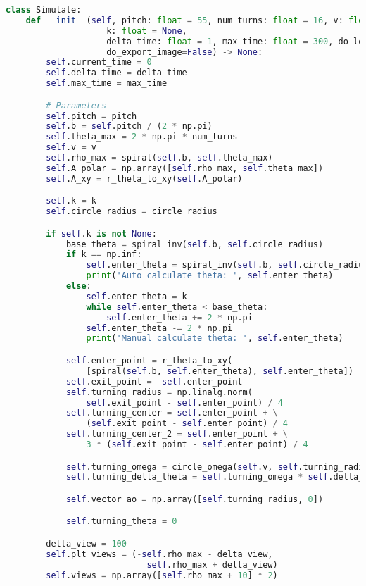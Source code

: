 \begin{lstlisting}[language=python]
class Simulate:
    def __init__(self, pitch: float = 55, num_turns: float = 16, v: float = 100, circle_radius: float = 16,
                    k: float = None,
                    delta_time: float = 1, max_time: float = 300, do_log=False, do_collision_check=False,
                    do_export_image=False) -> None:
        self.current_time = 0
        self.delta_time = delta_time
        self.max_time = max_time

        # Parameters
        self.pitch = pitch
        self.b = self.pitch / (2 * np.pi)
        self.theta_max = 2 * np.pi * num_turns
        self.v = v
        self.rho_max = spiral(self.b, self.theta_max)
        self.A_polar = np.array([self.rho_max, self.theta_max])
        self.A_xy = r_theta_to_xy(self.A_polar)

        self.k = k
        self.circle_radius = circle_radius

        if self.k is not None:
            base_theta = spiral_inv(self.b, self.circle_radius)
            if k == np.inf:
                self.enter_theta = spiral_inv(self.b, self.circle_radius)
                print('Auto calculate theta: ', self.enter_theta)
            else:
                self.enter_theta = k
                while self.enter_theta < base_theta:
                    self.enter_theta += 2 * np.pi
                self.enter_theta -= 2 * np.pi
                print('Manual calculate theta: ', self.enter_theta)

            self.enter_point = r_theta_to_xy(
                [spiral(self.b, self.enter_theta), self.enter_theta])
            self.exit_point = -self.enter_point
            self.turning_radius = np.linalg.norm(
                self.exit_point - self.enter_point) / 4
            self.turning_center = self.enter_point + \
                (self.exit_point - self.enter_point) / 4
            self.turning_center_2 = self.enter_point + \
                3 * (self.exit_point - self.enter_point) / 4

            self.turning_omega = circle_omega(self.v, self.turning_radius)
            self.turning_delta_theta = self.turning_omega * self.delta_time

            self.vector_ao = np.array([self.turning_radius, 0])

            self.turning_theta = 0

        delta_view = 100
        self.plt_views = (-self.rho_max - delta_view,
                            self.rho_max + delta_view)
        self.views = np.array([self.rho_max + 10] * 2)


\end{lstlisting}
